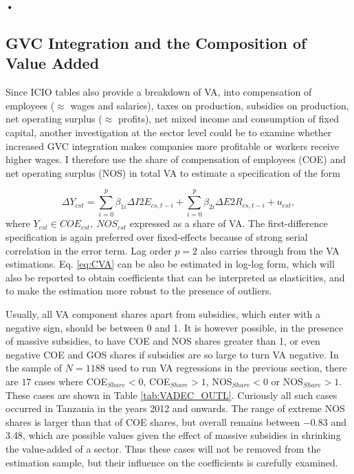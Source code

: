 \textbf{\textbf{•}}\documentclass[a4paper]{article}
\begin{document}
\subsection{GVC Integration and the Composition of Value Added}
Since ICIO tables also provide a breakdown of VA, into compensation of employees ($\approx$ wages and salaries), taxes on production, subsidies on production, net operating surplus ($\approx$ profits), net mixed income and consumption of fixed capital, another investigation at the sector level could be to examine whether increased GVC integration makes companies more profitable or workers receive higher wages. I therefore use the share of compensation of employees (COE) and net operating surplus (NOS) in total VA to estimate a specification of the form

\begin{equation} \label{eq:CVA}
\Delta Y_{cst} = \sum_{i=0}^p \beta_{1i} \Delta I2E_{cs,t-i} + \sum_{i = 0}^p \beta_{2i} \Delta E2R_{cs,t-i}  + u_{cst},
\end{equation}
where $Y_{cst} \in COE_{cst},\ NOS_{cst}$ expressed as a share of VA. The first-difference specification is again preferred over fixed-effects because of strong serial correlation in the error term. Lag order $p=2$ also carries through from the VA estimations. Eq. \ref{eq:CVA} can be also be estimated in log-log form, which will also be reported to obtain coefficients that can be interpreted as elasticities, and to make the estimation more robust to the presence of outliers. \newline

Usually, all VA component shares apart from subsidies, which enter with a negative sign, should be between 0 and 1. It is however possible, in the presence of massive subsidies, to have COE and NOS shares greater than 1, or even negative COE and GOS shares  if  subsidies are so large to turn VA negative. In the sample of $N=1188$ used to run VA regressions in the previous section, there are $17$ cases where COE$_{Share} < 0$, COE$_{Share} > 1$, NOS$_{Share} < 0$ or NOS$_{Share} > 1$. These cases are shown in Table \ref{tab:VADEC_OUTL}.  Curiously all such cases occurred in Tanzania in the years 2012 and onwards. The range of extreme NOS shares is larger than that of COE shares, but overall remains between $-0.83$ and $3.48$, which are possible values given the effect of massive subsidies in shrinking the value-added of a sector. Thus these cases will not be removed from the estimation sample, but their influence on the coefficients is carefully examined. 
\end{document}
